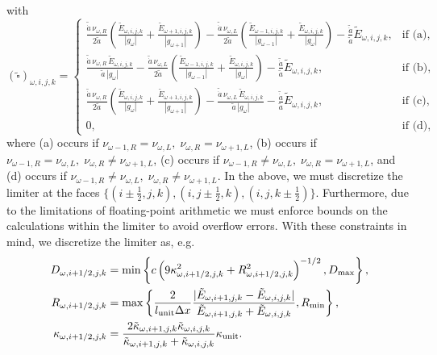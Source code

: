 \documentclass[10pt]{article}
\renewcommand{\(}{\left(}
\renewcommand{\)}{\right)}
\newcommand{\adot}{\dot{a}}
\newcommand{\Lunit}{l_{\text{unit}}}
\newcommand{\Kunit}{\kappa_{\text{unit}}}
\newcommand{\tK}{\tilde{\kappa}}
\newcommand{\tE}{\tilde{E}}
\newcommand{\tA}{\tilde{a}}
\newcommand{\tAdot}{\tilde{\adot}}
\begin{document}
with
\begin{equation}
\label{eq:square_omega_normalized_discretized}
  (\tilde{\square})_{\omega,i,j,k} = \begin{cases}
     \frac{\tAdot\, \nu_{\omega,R}}{2\tA}\left(\frac{\tE_{\omega,i,j,k}}{|g_{\omega}|} + \frac{\tE_{\omega+1,i,j,k}}{|g_{\omega+1}|}\right) -
      \frac{\tAdot\, \nu_{\omega,L}}{2\tA}\left(\frac{\tE_{\omega-1,i,j,k}}{|g_{\omega-1}|}+\frac{\tE_{\omega,i,j,k}}{|g_{\omega}|}\right) -
      \frac{\tAdot}{\tA}\tE_{\omega,i,j,k},&
      \text{if (a)},\\
     \frac{\tAdot\, \nu_{\omega,R}\, \tE_{\omega,i,j,k}}{\tA\, |g_{\omega}|} -
      \frac{\tAdot\, \nu_{\omega,L}}{2\tA}\left(\frac{\tE_{\omega-1,i,j,k}}{|g_{\omega-1}|}+\frac{\tE_{\omega,i,j,k}}{|g_{\omega}|}\right) -
      \frac{\tAdot}{\tA}\tE_{\omega,i,j,k},&
      \text{if (b)},\\
     \frac{\tAdot\, \nu_{\omega,R}}{2\tA}\left(\frac{\tE_{\omega,i,j,k}}{|g_{\omega}|} + \frac{\tE_{\omega+1,i,j,k}}{|g_{\omega+1}|}\right) -
      \frac{\tAdot\, \nu_{\omega,L}\, \tE_{\omega,i,j,k}}{\tA\, |g_{\omega}|} -
      \frac{\tAdot}{\tA}\tE_{\omega,i,j,k},&
      \text{if (c)},\\
     0,& \text{if (d)},
  \end{cases}
\end{equation}
where (a) occurs if $\nu_{\omega-1,R}=\nu_{\omega,L},\;\nu_{\omega,R}=\nu_{\omega+1,L}$, 
(b) occurs if $\nu_{\omega-1,R}=\nu_{\omega,L},\; \nu_{\omega,R}\ne\nu_{\omega+1,L}$, 
(c) occurs if $\nu_{\omega-1,R}\ne\nu_{\omega,L},\; \nu_{\omega,R}=\nu_{\omega+1,L}$, 
and (d) occurs if $\nu_{\omega-1,R}\ne\nu_{\omega,L},\; \nu_{\omega,R}\ne\nu_{\omega+1,L}$.
In the above, we must discretize the limiter at the faces
$\{(i\pm\frac12,j,k),(i,j\pm\frac12,k),(i,j,k\pm\frac12)\}$.
Furthermore, due to the limitations of floating-point arithmetic we
must enforce bounds on the calculations within the limiter to avoid
overflow errors.  With these constraints in mind, we discretize the
limiter as, e.g.
\begin{align}
  \label{eq:discrete_limiter}
  D_{\omega,i+1/2,j,k} &= \min\left\{ c \left(9\kappa_{\omega,i+1/2,j,k}^2 + R_{\omega,i+1/2,j,k}^2\right)^{-1/2},
    D_\text{max} \right\},\\
  \notag
  R_{\omega,i+1/2,j,k} &= \max\left\{\frac{2}{\Lunit \Delta x} \frac{|\tE_{\omega,i+1,j,k}-\tE_{\omega,i,j,k}|}{\tE_{\omega,i+1,j,k}+\tE_{\omega,i,j,k}}, R_\text{min} \right\}, \\
  \notag
  \kappa_{\omega,i+1/2,j,k} &= \frac{2 \tK_{\omega,i+1,j,k} \tK_{\omega,i,j,k}}{\tK_{\omega,i+1,j,k} + \tK_{\omega,i,j,k}}\Kunit.
\end{align}
\end{document}
